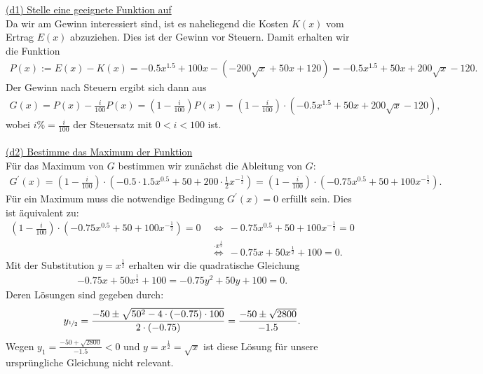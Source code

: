 \underline{(d1) Stelle eine geeignete Funktion auf}\\
Da wir am Gewinn interessiert sind, ist es naheliegend die Kosten $ K(x) $ vom Ertrag $ E(x) $ abzuziehen. Dies ist der Gewinn vor Steuern.
Damit erhalten wir die Funktion
\begin{align*}
	P(x) := E(x) - K(x)
	=
	-0.5x^{1.5} + 100 x- (-200\sqrt{x} + 50 x +120)
	=
	-0.5x^{1.5} + 50 x + 200 \sqrt{x} -120.
\end{align*}
Der Gewinn nach Steuern ergibt sich dann aus
\begin{align*}
	G(x) = P(x) - \frac{i}{100} P(x)
	=
	\left(1- \frac{i}{100}\right)P(x)
	=
	\left(1- \frac{i}{100}\right) \cdot (-0.5x^{1.5} + 50 x + 200 \sqrt{x} -120),
\end{align*}
wobei $ i \% = \frac{i}{100}$ der Steuersatz mit $ 0 < i < 100 $ ist.\\
\\
\underline{(d2) Bestimme das Maximum der Funktion}\\
Für das Maximum von $ G $ bestimmen wir zunächst die Ableitung von $ G $:
\begin{align*}
	G^\prime(x)
	= \left(1 - \frac{i}{100}\right)
	\cdot \left(-0.5 \cdot 1.5 x^{0.5} + 50 + 200 \cdot \frac{1}{2} x^{- \frac{1}{2}} \right)
	=
	\left(1 - \frac{i}{100}\right)
	\cdot \left(-0.75 x^{0.5} + 50 + 100 x^{- \frac{1}{2}} \right).
\end{align*}
Für ein Maximum muss die notwendige Bedingung $ G^\prime(x) = 0 $ erfüllt sein.
Dies ist äquivalent zu:
\begin{align*}
	\left(1 - \frac{i}{100}\right)
	\cdot \left(-0.75 x^{0.5} + 50 + 100 x^{- \frac{1}{2}} \right) = 0
	\ &\Leftrightarrow \
	-0.75 x^{0.5} + 50 + 100 x^{- \frac{1}{2}}  = 0\\
	\ &\overset{\cdot x^{\frac{1}{2}}}{\Leftrightarrow}\
	-0.75 x + 50 x^{\frac{1}{2}} + 100   = 0.
\end{align*}
Mit der Substitution $ y = x^{\frac{1}{2}} $ erhalten wir die quadratische Gleichung
\begin{align*}
	-0.75 x + 50 x^{\frac{1}{2}} + 100 
	=
	-0.75 y^2 + 50 y + 100 = 0.
\end{align*}
Deren Lösungen sind gegeben durch:
\begin{align*}
	y_{\nicefrac{1}{2}}
	=
	\frac{-50 \pm \sqrt{50^2 - 4 \cdot (-0.75) \cdot 100}}{2 \cdot (-0.75)}
	= 
	\frac{-50 \pm \sqrt{2800}}{-1.5}.
\end{align*}
Wegen $ y_1 = \frac{-50 + \sqrt{2800}}{-1.5}  < 0 $ und $ y = x^{\frac{1}{2}} =  \sqrt{x} $ ist diese Lösung für unsere ursprüngliche Gleichung nicht relevant.
